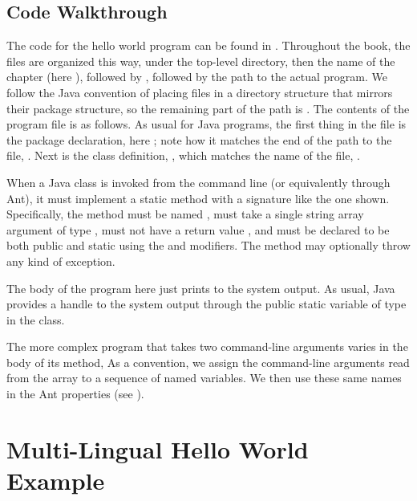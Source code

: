 \subsection{Code Walkthrough}\label{section-intro-hello-code}

The code for the hello world program can be found in
.
Throughout the book, the files are organized this way, under the
top-level  directory, then the name of the chapter (here
), followed by , followed by the path to
the actual program.  We follow the Java convention of placing files in
a directory structure that mirrors their package structure, so the
remaining part of the path is
.  The contents of
the  program file is as follows.
%
%
As usual for Java programs, the first thing in the file is the package
declaration, here ; note how it matches
the end of the path to the file, .
Next is the class definition, , which matches the
name of the file, .

When a Java class is invoked from the command line (or equivalently
through Ant), it must implement a static method with a signature like
the one shown.  Specifically, the method must be named ,
must take a single string array argument of type , must
not have a return value , and must be
declared to be both public and static using the
 and  modifiers.  The method may optionally throw
any kind of exception.

The body of the program here just prints  to the
system output.  As usual, Java provides a handle to the system output
through the public static variable  of type
 in the  class.

The more complex program  that takes two
command-line arguments varies in the body of its  method, 
%
%
As a convention, we assign the command-line arguments read
from the array  to a sequence of named variables.  
We then use these same names in the Ant properties (see ).

\section{Multi-Lingual Hello World Example}\label{section:console}

